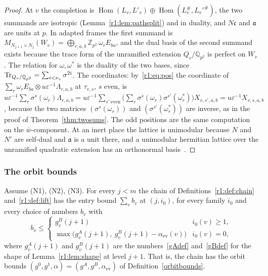 \begin{proof}
At $v$ the completion is $\operatorname{Hom}(L_v,L'_v)\oplus\operatorname{Hom}(L_v^\#,L_v'^\#)$, the two summands are isotropic (Lemma~\ref{r1:lem:pathsplit}) and in duality, and $N\mathfrak c$ and $\mathfrak a$ are units at $p$. In adapted frames the first summand is $M_{N_{j+1}\times N_j}(W_v)=\bigoplus_{r,a,b}\mathbb Z_{p^2}\,\omega_rE_{ba}$, and the dual basis of the second summand exists because the trace form of the unramified extension $Q_v/\mathbb Q_{p^2}$ is perfect on $W_v$. The relation for $\omega,\omega^\ast$ is the duality of the two bases, since $\operatorname{Tr}_{Q_v/\mathbb Q_{p^2}}=\sum_{i<\nu_v}\sigma^{2i}$. The coordinates: by~\eqref{r1:eq:pos} the coordinate of $\sum_{r}\omega_r E_{ba}\otimes u\varepsilon^{-1}\Lambda_{r,a,b}$ at $\tau_{v,s}$, $s$ even, is $u\varepsilon^{-1}\sum_r\sigma^s(\omega_r)\Lambda_{r,a,b}=u\varepsilon^{-1}\sum_{s'\ \mathrm{even}}\big(\sum_r\sigma^s(\omega_r)\sigma^{s'}(\omega^\ast_r)\big)X_{v,s',a,b}=u\varepsilon^{-1}X_{v,s,a,b}$, because the two matrices $(\sigma^{s}(\omega_r))$ and $(\sigma^{s'}(\omega_r^\ast))$ are inverse, as in the proof of Theorem~\ref{thm:twosums}. The odd positions are the same computation on the $\bar w$-component. At an inert place the lattice is unimodular because $N$ and $N'$ are self-dual and $\mathfrak a$ is a unit there, and a unimodular hermitian lattice over the unramified quadratic extension has an orthonormal basis~\cite[Section~7]{jacobowitz}.
\end{proof}

\subsubsection{The orbit bounds}

\begin{theorem}\label{r1:thm:orbit}
Assume (N1), (N2), (N3). For every $j<m$ the chain of Definitions~\ref{r1:def:chain} and~\ref{r1:def:lift} has the entry bound $\sum_vb_v$ at $(j,i_0)$, for every family $i_0$ and every choice of numbers $b_v$ with
\[
b_v\le\begin{cases}g^B_v(j+1)&i_0(v)\ge1,\\\max\big(g^A_v(j+1),\ g^B_v(j+1)-\alpha_{\mathrm{ev}}(v)\big)&i_0(v)=0,\end{cases}
\]
where $g^A_v(j+1)$ and $g^B_v(j+1)$ are the numbers~\eqref{gAdef} and~\eqref{gBdef} for the shape of Lemma~\ref{r1:lem:shape} at level $j+1$. That is, the chain has the orbit bounds $(g^0,g^1,\alpha)=(g^A,g^B,\alpha_{\mathrm{ev}})$ of Definition~\ref{orbitbounds}.
\end{theorem}

